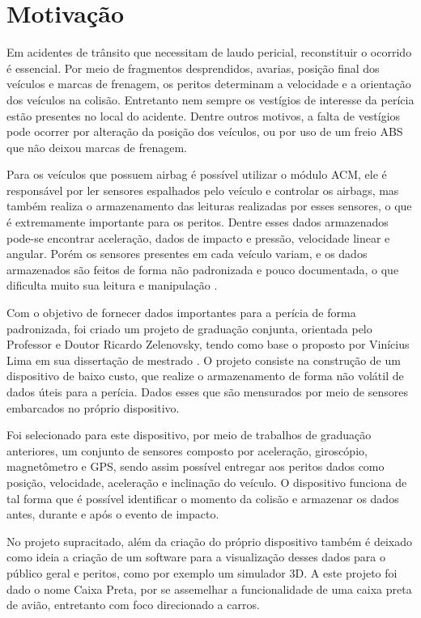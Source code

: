 \section{Motivação}

Em acidentes de trânsito que necessitam de laudo pericial, reconstituir o ocorrido é essencial. Por meio de fragmentos desprendidos, avarias, posição final dos veículos e marcas de frenagem, os peritos determinam a velocidade e a orientação dos veículos na colisão. Entretanto nem sempre os vestígios de interesse da perícia estão presentes no local do acidente. Dentre outros motivos, a falta de vestígios pode ocorrer por alteração da posição dos veículos, ou por uso de um freio ABS que não deixou marcas de frenagem.

Para os veículos que possuem airbag é possível utilizar o módulo \acrfull{ACM}, ele é responsável por ler sensores espalhados pelo veículo e controlar os airbags, mas também realiza o armazenamento das leituras realizadas por esses sensores, o que é extremamente importante para os peritos. Dentre esses dados armazenados pode-se encontrar aceleração, dados de impacto e pressão, velocidade linear e angular. Porém os sensores presentes em cada veículo variam, e os dados armazenados são feitos de forma não padronizada e pouco documentada, o que dificulta muito sua leitura e manipulação \cite{lima_proposta_2016}.

Com o objetivo de fornecer dados importantes para a perícia de forma padronizada, foi criado um projeto de graduação conjunta, orientada pelo Professor e Doutor Ricardo Zelenovsky, tendo como base o proposto por Vinícius Lima em sua dissertação de mestrado \cite{lima_proposta_2016}. O projeto consiste na construção de um dispositivo de baixo custo, que realize o armazenamento de forma não volátil de dados úteis para a perícia. Dados esses que são mensurados por meio de sensores embarcados no próprio dispositivo.

Foi selecionado para este dispositivo, por meio de trabalhos de graduação anteriores, um conjunto de sensores composto por aceleração, giroscópio, magnetômetro e GPS, sendo assim possível entregar aos peritos dados como posição, velocidade, aceleração e inclinação do veículo. O dispositivo funciona de tal forma que é possível identificar o momento da colisão e armazenar os dados antes, durante e após o evento de impacto.

No projeto supracitado, além da criação do próprio dispositivo também é deixado como ideia a criação de um software para a visualização desses dados para o público geral e peritos, como por exemplo um simulador 3D. A este projeto foi dado o nome Caixa Preta, por se assemelhar a funcionalidade de uma caixa preta de avião, entretanto com foco direcionado a carros.

